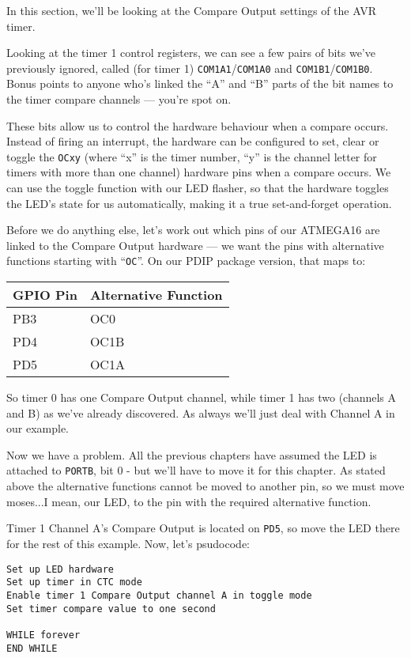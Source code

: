 \documentclass[a4paper,oneside]{book}
\begin{document}
In this section, we'll be looking at the Compare Output settings of the AVR timer.

Looking at the timer 1 control registers, we can see a few pairs of bits we've previously ignored, called (for timer 1) \texttt{COM1A1}/\texttt{COM1A0} and \texttt{COM1B1}/\texttt{COM1B0}. Bonus points to anyone who's linked the ``A'' and ``B'' parts of the bit names to the timer compare channels --- you're spot on.

These bits allow us to control the hardware behaviour when a compare occurs. Instead of firing an interrupt, the hardware can be configured to set, clear or toggle the \texttt{OCxy} (where ``x'' is the timer number, ``y'' is the channel letter for timers with more than one channel) hardware pins when a compare occurs. We can use the toggle function with our LED flasher, so that the hardware toggles the LED's state for us automatically, making it a true set-and-forget operation.

Before we do anything else, let's work out which pins of our ATMEGA16 are linked to the Compare Output hardware --- we want the pins with alternative functions starting with ``\texttt{OC}''. On our PDIP package version, that maps to: 

\begin{center}
\begin{tabular}{|l|l|}
	\hline
	GPIO Pin & Alternative Function \\
	\hline
	PB3 & OC0  \\
	PD4 & OC1B \\
	PD5 & OC1A \\ 
	\hline
\end{tabular}
\end{center}

So timer 0 has one Compare Output channel, while timer 1 has two (channels A and B) as we've already discovered. As always we'll just deal with Channel A in our example.

Now we have a problem. All the previous chapters have assumed the LED is attached to \texttt{PORTB}, bit 0 - but we'll have to move it for this chapter. As stated above the alternative functions cannot be moved to another pin, so we must move moses...I mean, our LED, to the pin with the required alternative function.

Timer 1 Channel A's Compare Output is located on \texttt{PD5}, so move the LED there for the rest of this example. Now, let's psudocode:

\begin{center}
\begin{lstlisting}[keywordstyle=\color{black},commentstyle=\color{black}]
Set up LED hardware
Set up timer in CTC mode
Enable timer 1 Compare Output channel A in toggle mode
Set timer compare value to one second

WHILE forever
END WHILE 
\end{lstlisting}
\end{center}
\end{document}
